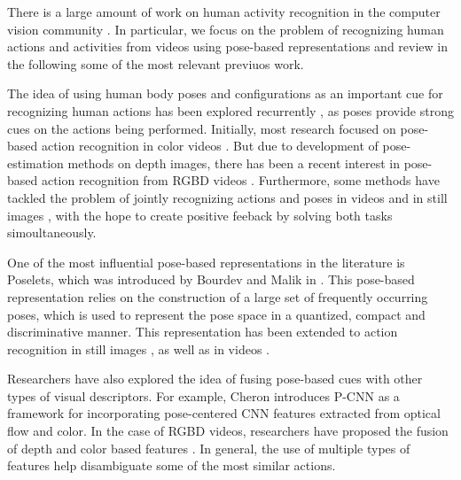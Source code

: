 There is a large amount of work on human activity recognition in the computer
vision community \cite{Aggarwal2011,Poppe2010}. 
In particular, we focus on the problem of recognizing human actions and
activities from videos using pose-based representations and review in the
following some of the most relevant previuos work.

The idea of using human body poses and configurations as an important
cue for recognizing human actions has been explored recurrently
\cite{Feng2002, Tao2015}, as poses provide strong cues on the actions
being performed.
Initially, most research focused on pose-based action recognition in color
videos \cite{Feng2002, Thurau2008}.
But due to development of pose-estimation
methods on depth images\cite{Shotton:EtAl:11}, there has been a recent interest in
pose-based action recognition from RGBD videos
\cite{Escorcia2012, Hu2015, Tao2015, Vemulapalli2014}.
Furthermore, some methods have tackled the problem of jointly recognizing
actions and poses in videos \cite{Nie2015} and in still images \cite{Yao2010},
with the hope to create positive feeback by solving both tasks simoultaneously.

One of the most influential pose-based representations in the literature
is Poselets, which was introduced by Bourdev and Malik in \cite{Bourdev2009}.
This pose-based representation relies on the construction of a large set of
frequently occurring poses, which is used to represent the pose space in a
quantized, compact and discriminative manner.
This representation has been extended to action recognition in still
images \cite{maji2011action},
as well as in videos \cite{Tao2015, Wang2014,Zanfir2013}.


Researchers have also explored the idea of fusing pose-based cues with
other types of visual descriptors. For example, Cheron \etal \cite{Cheron2015}
introduces P-CNN as a framework for incorporating pose-centered
CNN features extracted from optical flow and color.
In the case of RGBD videos, researchers have proposed the fusion
of depth and color based features \cite{Hu2015, Kong2015}.
In general, the use of multiple types of features help disambiguate some
of the most similar actions.

